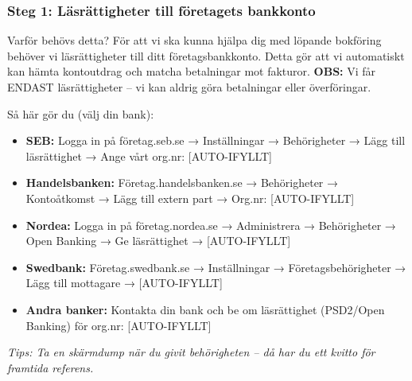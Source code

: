 \documentclass[10pt]{beamer}
\begin{document}
\begin{frame}[fragile]
  \frametitle{Steg 1: Läsrättigheter till företagets bankkonto}

  \begin{block}{Varför behövs detta?}
    \vspace{0.2cm}
    För att vi ska kunna hjälpa dig med löpande bokföring behöver vi läsrättigheter till ditt företagsbankkonto.
    Detta gör att vi automatiskt kan hämta kontoutdrag och matcha betalningar mot fakturor.
    \vspace{0.2cm}
    \textbf{OBS:} Vi får ENDAST läsrättigheter – vi kan aldrig göra betalningar eller överföringar.
  \end{block}

  \vspace{0.4cm}

  \begin{block}{Så här gör du (välj din bank):}
    \footnotesize
    \begin{itemize}
      \item \textbf{SEB:} Logga in på företag.seb.se → Inställningar → Behörigheter → Lägg till läsrättighet → Ange vårt org.nr: [AUTO-IFYLLT]
      \item \textbf{Handelsbanken:} Företag.handelsbanken.se → Behörigheter → Kontoåtkomst → Lägg till extern part → Org.nr: [AUTO-IFYLLT]
      \item \textbf{Nordea:} Logga in på företag.nordea.se → Administrera → Behörigheter → Open Banking → Ge läsrättighet → [AUTO-IFYLLT]
      \item \textbf{Swedbank:} Företag.swedbank.se → Inställningar → Företagsbehörigheter → Lägg till mottagare → [AUTO-IFYLLT]
      \item \textbf{Andra banker:} Kontakta din bank och be om läsrättighet (PSD2/Open Banking) för org.nr: [AUTO-IFYLLT]
    \end{itemize}
  \end{block}

  \vspace{0.4cm}
  \begin{center}
  \end{center}

  \vspace{0.3cm}
  \footnotesize
  \textit{Tips: Ta en skärmdump när du givit behörigheten – då har du ett kvitto för framtida referens.}

\end{frame}
\end{document}
